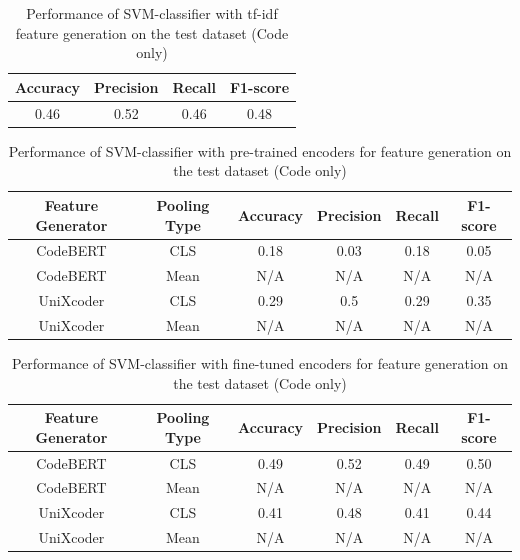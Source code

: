 \begin{table}[H]
    \caption{Performance of SVM-classifier with tf-idf feature generation on the test dataset (Code only)}
    \label{tab:test_perfomance_tfidf_svm_code}
        \begin{center}
            \begin{tabular}{c|c|c|c}
                \textbf{Accuracy} & \textbf{Precision} & \textbf{Recall} & \textbf{F1-score}  \\
                \hline
                0.46 & 0.52 & 0.46 & 0.48 \\
            \end{tabular}
        \end{center}
    \end{table}
    
    \begin{table}[H]
        \caption{Performance of SVM-classifier with pre-trained encoders for feature generation on the test dataset (Code only)}
        \label{tab:test_perfomance_pre_svm_code}
        \begin{center}
            \begin{tabular}{c|c|c|c|c|c}
                \textbf{Feature Generator} & \textbf{Pooling Type} & \textbf{Accuracy} & \textbf{Precision} & \textbf{Recall} & \textbf{F1-score}  \\
                \hline
                CodeBERT & CLS & 0.18 & 0.03 & 0.18 & 0.05 \\
                CodeBERT & Mean & N/A & N/A & N/A & N/A\\
                UniXcoder & CLS & 0.29 & 0.5 & 0.29 & 0.35 \\
                UniXcoder & Mean & N/A & N/A & N/A & N/A\\
            \end{tabular}
        \end{center}
    \end{table}
    
    
    \begin{table}[H]
        \caption{Performance of SVM-classifier with fine-tuned encoders for feature generation on the test dataset (Code only)}
        \label{tab:test_perfomance_fine_svm_code}
        \begin{center}
            \begin{tabular}{c|c|c|c|c|c}
                \textbf{Feature Generator} & \textbf{Pooling Type} & \textbf{Accuracy} & \textbf{Precision} & \textbf{Recall} & \textbf{F1-score}  \\
                \hline
                CodeBERT & CLS & 0.49 & 0.52 & 0.49 & 0.50 \\
                CodeBERT & Mean & N/A & N/A & N/A & N/A\\
                UniXcoder & CLS & 0.41 & 0.48 & 0.41 & 0.44 \\
                UniXcoder & Mean & N/A & N/A & N/A & N/A\\
            \end{tabular}
        \end{center}
    \end{table}
    
